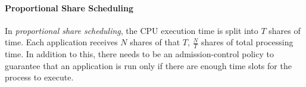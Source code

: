 \paragraph{Proportional Share Scheduling}\label{par:Proportional_Share_Scheduling}
\begin{definition}\label{def:Proportional_Share_Scheduling}
  In \emph{proportional share scheduling}, the CPU execution time is split into $T$ shares of time.
  Each application receives $N$ shares of that $T$, $\frac{N}{T}$ shares of total processing time.
  In addition to this, there needs to be an admission-control policy to guarantee that an application is run only if there are enough time slots for the process to execute.
\end{definition}

